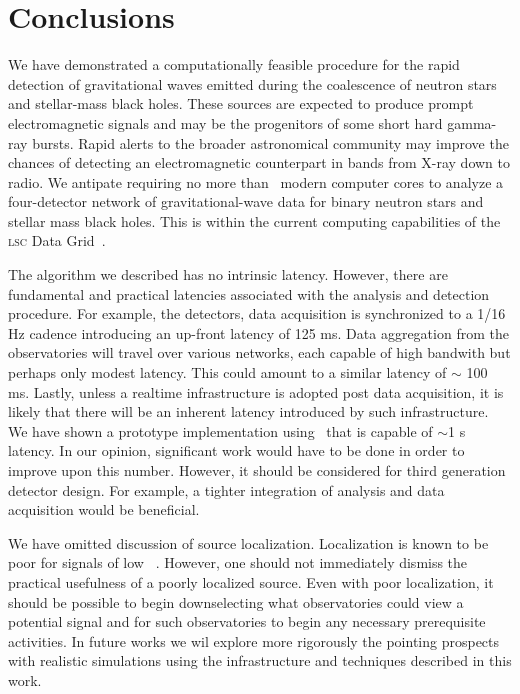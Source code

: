 \section{Conclusions}
\label{SECV}\label{sec:conclusions}

We have demonstrated a computationally feasible procedure for the rapid
detection of gravitational waves emitted during the coalescence of neutron
stars and stellar-mass black holes.  These sources are expected to produce
prompt electromagnetic signals and may be the progenitors of some short hard
gamma-ray bursts.  Rapid alerts to the broader astronomical community may
improve the chances of detecting an electromagnetic counterpart in bands from
X-ray down to radio.  We antipate requiring no more than \numcpus\ modern
computer cores to analyze a four-detector network of gravitational-wave data
for binary neutron stars and stellar mass black holes.  This is within the
current computing capabilities of the \textsc{lsc} Data Grid~\cite{LDG}.

The algorithm we described has no intrinsic latency.  However, there are
fundamental and practical latencies associated with the analysis and detection
procedure. For example, the \LIGO{} detectors, data acquisition is synchronized
to a 1/16 Hz cadence introducing an up-front latency of 125 ms.  Data
aggregation from the observatories will travel over various networks, each
capable of high bandwith but perhaps only modest latency.  This could amount to
a similar latency of $\sim$ 100 ms.  Lastly, unless a realtime infrastructure is
adopted post data acquisition, it is likely that there will be an inherent
latency introduced by such infrastructure.  We have shown a prototype
implementation using \gstlal\ that is capable of $\sim$1 s latency. In our
opinion, significant work would have to be done in order to improve upon this
number. However, it should be considered for third generation detector design.
For example, a tighter integration of analysis and data acquisition would be
beneficial.

We have omitted discussion of source localization. Localization is known to
be poor for signals of low \SNR~\cite{Fairhurst2009}.
However, one should not immediately dismiss the practical usefulness of a
poorly localized source. Even with poor localization, it should be possible to
begin downselecting what observatories could view a potential signal and for
such observatories to begin any necessary prerequisite activities. In future
works we wil explore more rigorously the pointing prospects with realistic
simulations using the infrastructure and techniques described in this work.

